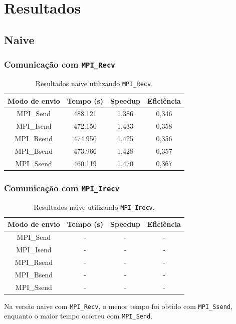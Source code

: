 \documentclass[12pt,a4paper]{article}
\begin{document}
\section{Resultados}
\subsection{Naive}

\subsubsection{Comunicação com \texttt{MPI\_Recv}}
\begin{table}[H]
\centering
\begin{tabular}{|c|c|c|c|}
\hline
\textbf{Modo de envio} & \textbf{Tempo (s)} & \textbf{Speedup} & \textbf{Eficiência} \\
\hline
MPI\_Send & 488.121 & 1,386 & 0,346 \\
\hline
MPI\_Isend & 472.150 & 1,433 & 0,358 \\
\hline
MPI\_Rsend & 474.950 & 1,425 & 0,356 \\
\hline
MPI\_Bsend & 473.966 & 1,428 & 0,357 \\
\hline
MPI\_Ssend & 460.119 & 1,470 & 0,367 \\
\hline
\end{tabular}
\caption{Resultados naive utilizando \texttt{MPI\_Recv}.}
\end{table}

\subsubsection{Comunicação com \texttt{MPI\_Irecv}}
\begin{table}[H]
\centering
\begin{tabular}{|c|c|c|c|}
\hline
\textbf{Modo de envio} & \textbf{Tempo (s)} & \textbf{Speedup} & \textbf{Eficiência} \\
\hline
MPI\_Send & - & - & - \\
\hline
MPI\_Isend & - & - & - \\
\hline
MPI\_Rsend & - & - & - \\
\hline
MPI\_Bsend & - & - & - \\
\hline
MPI\_Ssend & - & - & - \\
\hline
\end{tabular}
\caption{Resultados naive utilizando \texttt{MPI\_Irecv}.}
\end{table}

Na versão naive com \texttt{MPI\_Recv}, o menor tempo foi obtido com \texttt{MPI\_Ssend}, enquanto o maior tempo ocorreu com \texttt{MPI\_Send}.
\end{document}
